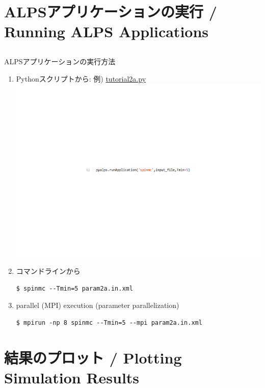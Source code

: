\section{ALPSアプリケーションの実行 / Running ALPS Applications}
\subsection*{\redb\whiteb\greenb}

\begin{frame}[t,fragile]{ALPSアプリケーションの実行方法}
  \begin{enumerate}
  \item Pythonスクリプトから: 例) \href{https://github.com/cmsi/alps-tutorial/blob/tutorials/tutorials/mc-02-susceptibilities/tutorial2a.py}{tutorial2a.py}
    \includegraphics[height=.08\textheight]{tutorial2a-2.pdf}
  \item コマンドラインから
\begin{lstlisting}
$ spinmc --Tmin=5 param2a.in.xml
\end{lstlisting}
  \item parallel (MPI) execution (parameter parallelization)
\begin{lstlisting}
$ mpirun -np 8 spinmc --Tmin=5 --mpi param2a.in.xml
\end{lstlisting}
  \end{enumerate}
\end{frame}

\section{結果のプロット / Plotting Simulation Results}
